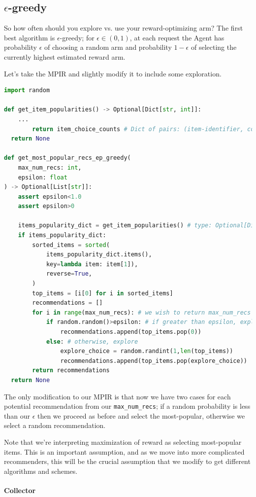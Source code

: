\subsection{$\epsilon$-greedy}

So how often should you explore vs. use your reward-optimizing arm? The first best algorithm is $\epsilon$-greedy; for $\epsilon \in (0,1)$, at each request the Agent has probability $\epsilon$ of choosing a random arm and probability $1-\epsilon$ of selecting the currently highest estimated reward arm.

Let's take the MPIR and slightly modify it to include some exploration. 

\begin{lstlisting}[language=Python]
import random

def get_item_popularities() -> Optional[Dict[str, int]]:
	...
		return item_choice_counts # Dict of pairs: (item-identifier, count item chosen)
  return None

def get_most_popular_recs_ep_greedy(
	max_num_recs: int, 
	epsilon: float
) -> Optional[List[str]]:
	assert epsilon<1.0
	assert epsilon>0

	items_popularity_dict = get_item_popularities() # type: Optional[Dict[str, int]]
	if items_popularity_dict:
		sorted_items = sorted(
			items_popularity_dict.items(), 
			key=lambda item: item[1]),
			reverse=True,
		)
		top_items = [i[0] for i in sorted_items]
		recommendations = []
		for i in range(max_num_recs): # we wish to return max_num_recs
			if random.random()>epsilon: # if greater than epsilon, exploit
				recommendations.append(top_items.pop(0))
			else: # otherwise, explore
				explore_choice = random.randint(1,len(top_items))
				recommendations.append(top_items.pop(explore_choice))
		return recommendations
  return None
\end{lstlisting}

The only modification to our MPIR is that now we have two cases for each potential recommendation from our \lstinline{max_num_recs}; if a random probability is less than our $\epsilon$ then we proceed as before and select the most-popular, otherwise we select a random recommendation. 

Note that we're interpreting maximization of reward as selecting most-popular items. This is an important assumption, and as we move into more complicated recommenders, this will be the crucial assumption that we modify to get different algorithms and schemes.

\paragraph{Collector}

